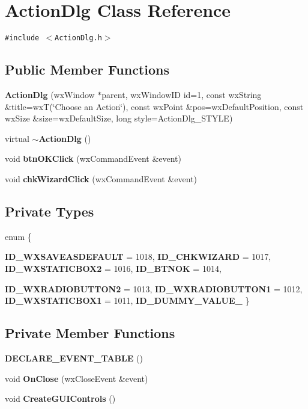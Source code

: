 \section{Action\-Dlg Class Reference}
\label{class_action_dlg}
{\tt \#include $<$Action\-Dlg.h$>$}

\subsection*{Public Member Functions}
\begin{CompactItemize}
\item 
{\bf Action\-Dlg} (wx\-Window $\ast$parent, wx\-Window\-ID id=1, const wx\-String \&title=wx\-T(\char`\"{}Choose an Action\char`\"{}), const wx\-Point \&pos=wx\-Default\-Position, const wx\-Size \&size=wx\-Default\-Size, long style=Action\-Dlg\_\-STYLE)
\item 
virtual {\bf $\sim$Action\-Dlg} ()
\item 
void {\bf btn\-OKClick} (wx\-Command\-Event \&event)
\item 
void {\bf chk\-Wizard\-Click} (wx\-Command\-Event \&event)
\end{CompactItemize}
\subsection*{Private Types}
\begin{CompactItemize}
\item 
enum \{ \par
{\bf ID\_\-WXSAVEASDEFAULT} =  1018, 
{\bf ID\_\-CHKWIZARD} =  1017, 
{\bf ID\_\-WXSTATICBOX2} =  1016, 
{\bf ID\_\-BTNOK} =  1014, 
\par
{\bf ID\_\-WXRADIOBUTTON2} =  1013, 
{\bf ID\_\-WXRADIOBUTTON1} =  1012, 
{\bf ID\_\-WXSTATICBOX1} =  1011, 
{\bf ID\_\-DUMMY\_\-VALUE\_\-}
 \}
\end{CompactItemize}
\subsection*{Private Member Functions}
\begin{CompactItemize}
\item 
{\bf DECLARE\_\-EVENT\_\-TABLE} ()
\item 
void {\bf On\-Close} (wx\-Close\-Event \&event)
\item 
void {\bf Create\-GUIControls} ()
\end{CompactItemize}
